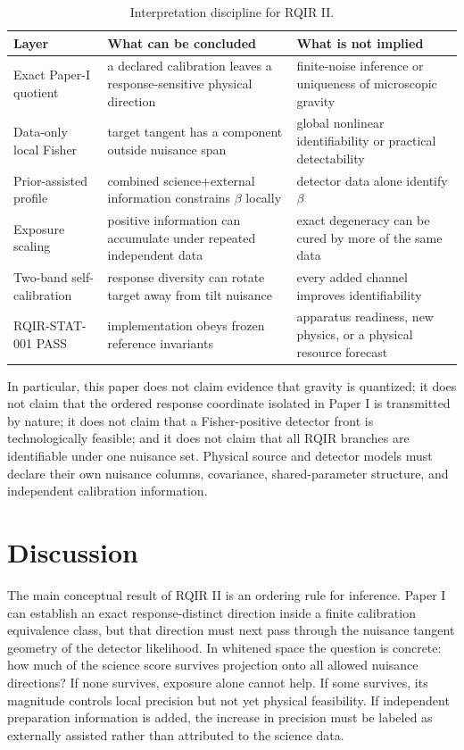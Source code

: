 \begin{table}[t]
\caption{Interpretation discipline for RQIR II.}
\label{tab:claims}
\begin{ruledtabular}
\begin{tabular}{p{}p{}p{}}
Layer & What can be concluded & What is not implied\\
\hline
Exact Paper-I quotient & a declared calibration leaves a response-sensitive physical direction & finite-noise inference or uniqueness of microscopic gravity\\
Data-only local Fisher & target tangent has a component outside nuisance span & global nonlinear identifiability or practical detectability\\
Prior-assisted profile & combined science+external information constrains $\beta$ locally & detector data alone identify $\beta$\\
Exposure scaling & positive information can accumulate under repeated independent data & exact degeneracy can be cured by more of the same data\\
Two-band self-calibration & response diversity can rotate target away from tilt nuisance & every added channel improves identifiability\\
RQIR-STAT-001 PASS & implementation obeys frozen reference invariants & apparatus readiness, new physics, or a physical resource forecast\\
\end{tabular}
\end{ruledtabular}
\end{table}

In particular, this paper does not claim evidence that gravity is quantized; it does not claim that the ordered response coordinate isolated in Paper I is transmitted by nature; it does not claim that a Fisher-positive detector front is technologically feasible; and it does not claim that all RQIR branches are identifiable under one nuisance set. Physical source and detector models must declare their own nuisance columns, covariance, shared-parameter structure, and independent calibration information.

\section{Discussion}
\label{sec:discussion}

The main conceptual result of RQIR II is an ordering rule for inference. Paper I can establish an exact response-distinct direction inside a finite calibration equivalence class, but that direction must next pass through the nuisance tangent geometry of the detector likelihood. In whitened space the question is concrete: how much of the science score survives projection onto all allowed nuisance directions? If none survives, exposure alone cannot help. If some survives, its magnitude controls local precision but not yet physical feasibility. If independent preparation information is added, the increase in precision must be labeled as externally assisted rather than attributed to the science data.

